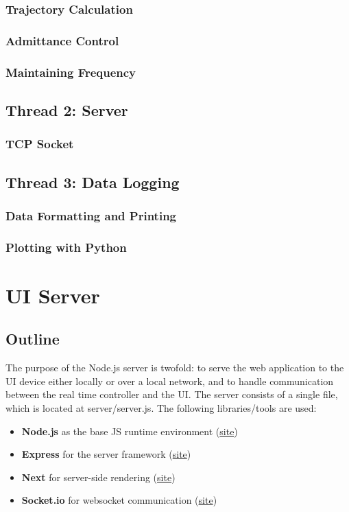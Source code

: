 \documentclass{article}
\begin{document}
	\subsubsection{Trajectory Calculation}
	\subsubsection{Admittance Control}
	\subsubsection{Maintaining Frequency}
	

	\subsection{Thread 2: Server}
	\subsubsection{TCP Socket}
	
	\subsection{Thread 3: Data Logging}
	\subsubsection{Data Formatting and Printing}
	\subsubsection{Plotting with Python}

\section{UI Server}
	\subsection{Outline}

	The purpose of the Node.js server is twofold: to serve the web application to the UI device either locally or over a local network, and to handle communication between the real time controller and the UI. The server consists of a single file, which is located at server/server.js. The following libraries/tools are used:
	
	\begin{itemize}
		\item \textbf{Node.js} as the base JS runtime environment (\href{https://nodejs.org/en/}{site})
		\item \textbf{Express} for the server framework (\href{https://expressjs.com/}{site})
		\item \textbf{Next} for server-side rendering (\href{https://nextjs.org/}{site})
		\item \textbf{Socket.io} for websocket communication (\href{https://socket.io/}{site})
	\end{itemize}
		
\end{document}
